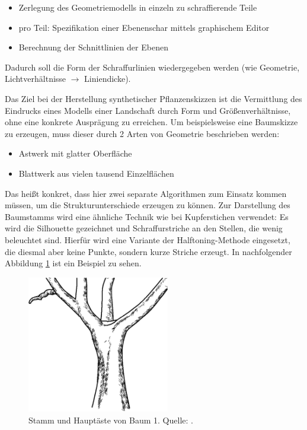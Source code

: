 \begin{itemize}
  \item Zerlegung des Geometriemodells in einzeln zu schraffierende Teile
  \item pro Teil: Spezifikation einer Ebenenschar mittels graphischem Editor
  \item Berechnung der Schnittlinien der Ebenen
\end{itemize}

Dadurch soll die Form der Schraffurlinien wiedergegeben werden (wie Geometrie, 
Lichtverhältnisse $\to$ Liniendicke). \par Das Ziel bei der Herstellung 
synthetischer Pflanzenskizzen ist die Vermittlung des Eindrucks eines Modells 
einer Landschaft durch Form und Größenverhältnisse, ohne eine konkrete 
Ausprägung zu erreichen. Um beispielsweise eine Baumskizze zu erzeugen, muss 
dieser durch 2 Arten von Geometrie beschrieben werden:

\begin{itemize}
  \item Astwerk mit glatter Oberfläche
  \item Blattwerk aus vielen tausend Einzelflächen
\end{itemize}

Das heißt konkret, dass hier zwei separate Algorithmen zum Einsatz kommen 
müssen, um die Strukturunterschiede erzeugen zu können. Zur Darstellung des 
Baumstamms wird eine ähnliche Technik wie bei Kupferstichen verwendet: Es wird 
die Silhouette gezeichnet und Schraffurstriche an den Stellen, die wenig 
beleuchtet sind. Hierfür wird eine Variante der Halftoning-Methode eingesetzt, 
die diesmal aber keine Punkte, sondern kurze Striche erzeugt. In nachfolgender 
Abbildung \ref{fig:Baum} ist ein Beispiel zu sehen.

\begin{figure}
  \centering
  \includegraphics[height=6cm]{../images/Deussen2000-tree-trunk-branches}
  \caption{Stamm und Hauptäste von Baum 1. Quelle: \cite{Deussen2000}.}
  \label{fig:Baum}
\end{figure}

